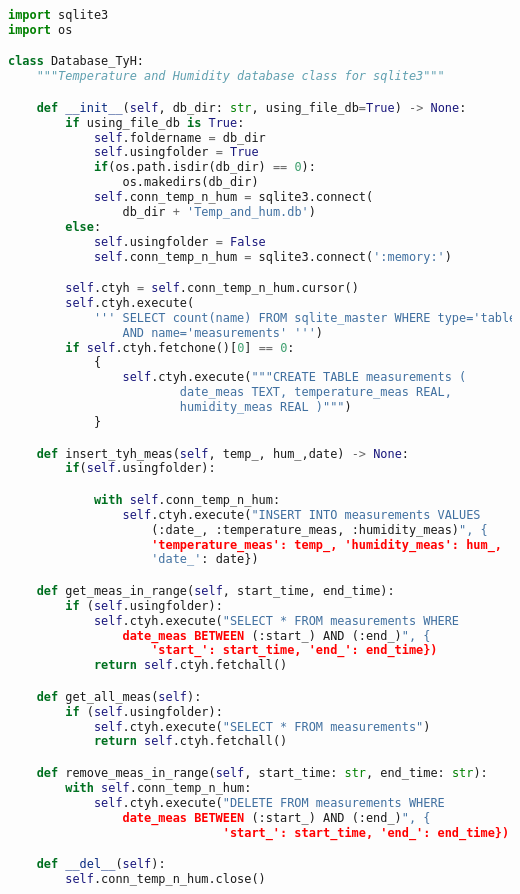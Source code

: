 \begin{lstlisting}[language=Python]
import sqlite3
import os

class Database_TyH:
    """Temperature and Humidity database class for sqlite3"""

    def __init__(self, db_dir: str, using_file_db=True) -> None:
        if using_file_db is True:
            self.foldername = db_dir
            self.usingfolder = True
            if(os.path.isdir(db_dir) == 0):
                os.makedirs(db_dir)
            self.conn_temp_n_hum = sqlite3.connect(
                db_dir + 'Temp_and_hum.db')
        else:
            self.usingfolder = False
            self.conn_temp_n_hum = sqlite3.connect(':memory:')

        self.ctyh = self.conn_temp_n_hum.cursor()
        self.ctyh.execute(
            ''' SELECT count(name) FROM sqlite_master WHERE type='table'
            	AND name='measurements' ''')
        if self.ctyh.fetchone()[0] == 0:
            {
                self.ctyh.execute("""CREATE TABLE measurements (
                        date_meas TEXT, temperature_meas REAL,
                        humidity_meas REAL )""")
            }

    def insert_tyh_meas(self, temp_, hum_,date) -> None:
        if(self.usingfolder):

            with self.conn_temp_n_hum:
                self.ctyh.execute("INSERT INTO measurements VALUES
                	(:date_, :temperature_meas, :humidity_meas)", {
                	'temperature_meas': temp_, 'humidity_meas': hum_,
                	'date_': date})

    def get_meas_in_range(self, start_time, end_time):
        if (self.usingfolder):
            self.ctyh.execute("SELECT * FROM measurements WHERE
            	date_meas BETWEEN (:start_) AND (:end_)", {
            		'start_': start_time, 'end_': end_time})
            return self.ctyh.fetchall()

    def get_all_meas(self):
        if (self.usingfolder):
            self.ctyh.execute("SELECT * FROM measurements")
            return self.ctyh.fetchall()

    def remove_meas_in_range(self, start_time: str, end_time: str):
        with self.conn_temp_n_hum:
            self.ctyh.execute("DELETE FROM measurements WHERE
            	date_meas BETWEEN (:start_) AND (:end_)", {
                              'start_': start_time, 'end_': end_time})

    def __del__(self):
        self.conn_temp_n_hum.close()
\end{lstlisting}

